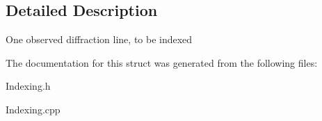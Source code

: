 \subsection{Detailed Description}
One observed diffraction line, to be indexed 

The documentation for this struct was generated from the following files\+:\begin{DoxyCompactItemize}
\item 
Indexing.\+h\item 
Indexing.\+cpp\end{DoxyCompactItemize}
